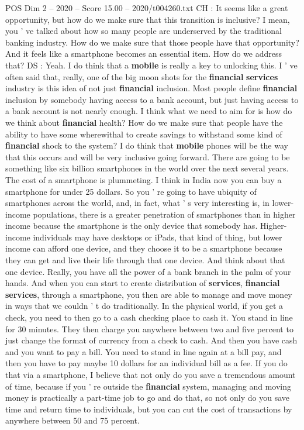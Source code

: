 \begin{textsample}{POS Dim 2 – 2020 – Score 15.00 – 2020/t004260.txt}
CH : It seems like a great opportunity, but how do we make sure that this transition is inclusive?
I mean, you ' ve talked about how so many people are underserved by the traditional banking industry.
How do we make sure that those people have that opportunity?
And it feels like a smartphone becomes an essential item.
How do we address that?
DS : Yeah.
I do think that a \textbf{mobile} is really a key to unlocking this.
I ' ve often said that, really, one of the big moon shots for the \textbf{financial} \textbf{services} industry is this idea of not just \textbf{financial} inclusion.
Most people define \textbf{financial} inclusion by somebody having access to a bank account, but just having access to a bank account is not nearly enough.
I think what we need to aim for is how do we think about \textbf{financial} health?
How do we make sure that people have the ability to have some wherewithal to create savings to withstand some kind of \textbf{financial} shock to the system?
I do think that \textbf{mobile} phones will be the way that this occurs and will be very inclusive going forward.
There are going to be something like six billion smartphones in the world over the next several years.
The cost of a smartphone is plummeting.
I think in India now you can buy a smartphone for under 25 dollars.
So you ' re going to have ubiquity of smartphones across the world, and, in fact, what ' s very interesting is, in lower-income populations, there is a greater penetration of smartphones than in higher income because the smartphone is the only device that somebody has.
Higher-income individuals may have desktops or iPads, that kind of thing, but lower income can afford one device, and they choose it to be a smartphone because they can get and live their life through that one device.
And think about that one device.
Really, you have all the power of a bank branch in the palm of your hands.
And when you can start to create distribution of \textbf{services}, \textbf{financial} \textbf{services}, through a smartphone, you then are able to manage and move money in ways that we couldn ' t do traditionally.
In the physical world, if you get a check, you need to then go to a cash checking place to cash it.
You stand in line for 30 minutes.
They then charge you anywhere between two and five percent to just change the format of currency from a check to cash.
And then you have cash and you want to pay a bill.
You need to stand in line again at a bill pay, and then you have to pay maybe 10 dollars for an individual bill as a fee.
If you do that via a smartphone, I believe that not only do you save a tremendous amount of time, because if you ' re outside the \textbf{financial} system, managing and moving money is practically a part-time job to go and do that, so not only do you save time and return time to individuals, but you can cut the cost of transactions by anywhere between 50 and 75 percent.

\end{textsample}
